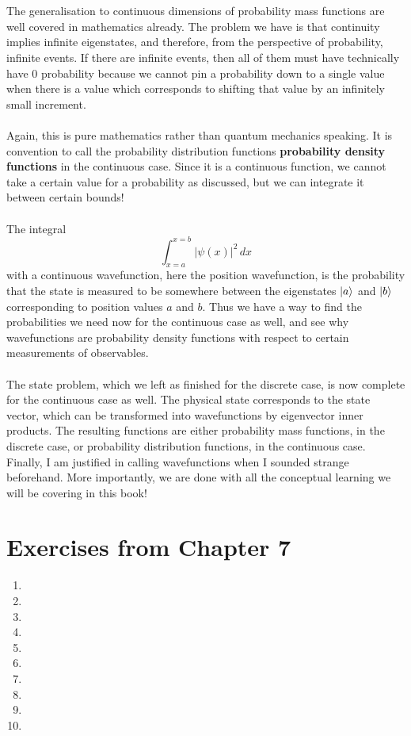 \\\\
The generalisation to continuous dimensions of probability mass functions are well covered in mathematics already. The problem we have is that continuity implies infinite eigenstates, and therefore, from the perspective of probability, infinite events. If there are infinite events, then all of them must have technically have $0$ probability because we cannot pin a probability down to a single value when there is a value which corresponds to shifting that value by an infinitely small increment.
\\\\
Again, this is pure mathematics rather than quantum mechanics speaking. It is convention to call the probability distribution functions \textbf{probability density functions} in the continuous case. Since it is a continuous function, we cannot take a certain value for a probability as discussed, but we can integrate it between certain bounds!
\\\\
The integral 
$$
\int_{x=a}^{x=b}|\psi(x)|^2\,dx
$$
with a continuous wavefunction, here the position wavefunction, is the probability that the state is measured to be somewhere between the eigenstates $|a\rangle$ and $|b\rangle$ corresponding to position values $a$ and $b$. Thus we have a way to find the probabilities we need now for the continuous case as well, and see why wavefunctions are probability density functions with respect to certain measurements of observables.
\\\\
The state problem, which we left as finished for the discrete case, is now complete for the continuous case as well. The physical state corresponds to the state vector, which can be transformed into wavefunctions by eigenvector inner products. The resulting functions are either probability mass functions, in the discrete case, or probability distribution functions, in the continuous case. Finally, I am justified in calling wavefunctions  when I sounded strange beforehand. More importantly, we are done with all the conceptual learning we will be covering in this book!
\section{Exercises from Chapter 7}
\begin{enumerate}
    \item 
    \item
    \item
    \item
    \item
    \item
    \item
    \item
    \item
    \item
\end{enumerate}